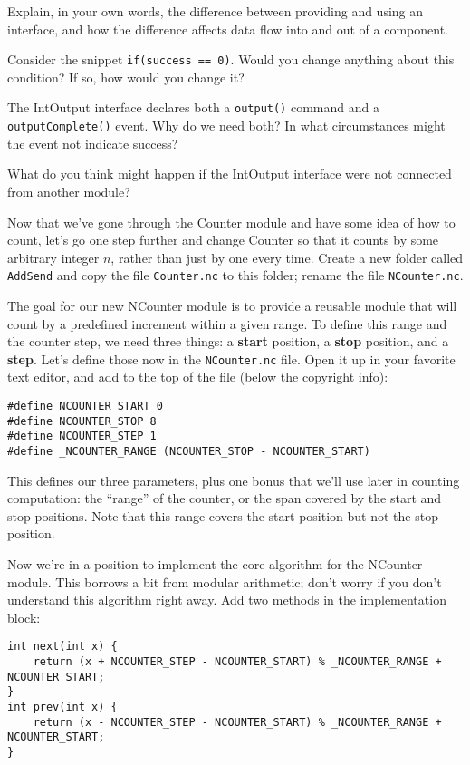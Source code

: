 \documentclass{article}
\begin{document}
 Explain, in your own words, the difference between providing and using an interface, and how the difference affects data flow into and out of a component.

 Consider the snippet \verb!if(success == 0)!. Would you change anything about this condition? If so, how would you change it?

 The IntOutput interface declares both a \verb!output()! command and a \verb!outputComplete()! event. Why do we need both? In what circumstances might the event not indicate success?

 What do you think might happen if the IntOutput interface were not connected from another module?


Now that we've gone through the Counter module and have some idea of how to count, let's go one step further and change Counter so that it counts by some arbitrary integer $n$, rather than just by one every time. Create a new folder called \verb!AddSend! and copy the file \verb!Counter.nc! to this folder; rename the file \verb!NCounter.nc!.

The goal for our new NCounter module is to provide a reusable module that will count by a predefined increment within a given range. To define this range and the counter step, we need three things: a \textbf{start} position, a \textbf{stop} position, and a \textbf{step}. Let's define those now in the \verb!NCounter.nc! file. Open it up in your favorite text editor, and add to the top of the file (below the copyright info):

\begin{verbatim}
#define NCOUNTER_START 0
#define NCOUNTER_STOP 8
#define NCOUNTER_STEP 1
#define _NCOUNTER_RANGE (NCOUNTER_STOP - NCOUNTER_START)
\end{verbatim}

This defines our three parameters, plus one bonus that we'll use later in counting computation: the ``range'' of the counter, or the span covered by the start and stop positions. Note that this range covers the start position but not the stop position.

Now we're in a position to implement the core algorithm for the NCounter module. This borrows a bit from modular arithmetic; don't worry if you don't understand this algorithm right away. Add two methods in the implementation block:

\begin{verbatim}
int next(int x) {
    return (x + NCOUNTER_STEP - NCOUNTER_START) % _NCOUNTER_RANGE + NCOUNTER_START;
}
int prev(int x) {
    return (x - NCOUNTER_STEP - NCOUNTER_START) % _NCOUNTER_RANGE + NCOUNTER_START;
}
\end{verbatim}
\end{document}
